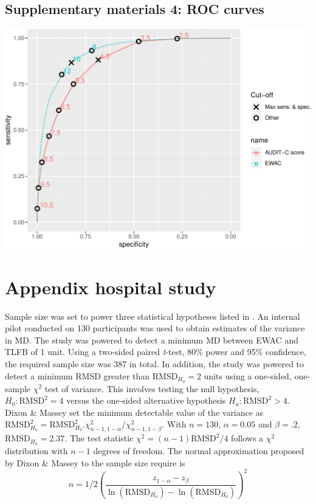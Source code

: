\documentclass[]{article}
\begin{document}
\hypertarget{supplementary-materials-4-roc-curves}{%
\subsection{Supplementary materials 4: ROC
curves}\label{supplementary-materials-4-roc-curves}}

\includegraphics{analysis_files/figure-latex/unnamed-chunk-5-1.pdf}

\hypertarget{appendix-hospital-study}{%
\section{Appendix hospital study}\label{appendix-hospital-study}}

Sample size was set to power three statistical hypotheses listed in
\citep{Dutey2018}. An internal pilot conducted on 130 participants was
used to obtain estimates of the variance in MD. The study was powered to
detect a minimum MD between EWAC and TLFB of 1 unit. Using a two-sided
paired \emph{t}-test, 80\% power and 95\% confidence, the required
sample size was 387 in total. In addition, the study was powered to
detect a minimum RMSD greater than \(\text{RMSD}_{H_0} = 2\) units using
a one-sided, one-sample \(\chi^2\) test of variance. This involves
testing the null hypothesis, \(H_0: \text{RMSD}^2 = 4\) versus the
one-sided alternative hypothesis \(H_a: \text{RMSD}^2 > 4\). Dixon \&
Massey \citep{Dixon1983} set the minimum detectable value of the
variance as
\(\text{RMSD}_{H_a}^2 = \text{RMSD}_{H_0}^2 . \chi^2_{n-1, 1-\alpha} / \chi^2_{n-1, 1-\beta}\).
With \(n = 130\), \(\alpha = 0.05\) and \(\beta=.2\),
\(\text{RMSD}_{H_a} = 2.37\). The test statistic
\(\chi^2 = (n-1)\text{RMSD}^2 / 4\) follows a \(\chi^2\) distribution
with \(n-1\) degrees of freedom. The normal approximation proposed by
Dixon \& Massey \citep{Dixon1983} to the sample size require is
\[n = 1/2 \left( \dfrac{z_{1-\alpha}-z_\beta}{\ln(\text{RMSD}_{H_a}) - \ln(\text{RMSD}_{H_0})}\right)^2  \]
\end{document}
